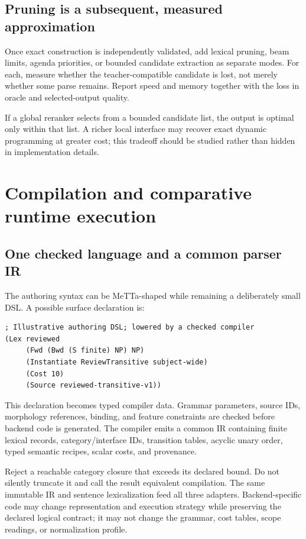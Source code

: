 \documentclass[11pt,a4paper]{article}
\begin{document}
\subsection{Pruning is a subsequent, measured approximation}
Once exact construction is independently validated, add lexical pruning,
beam limits, agenda priorities, or bounded candidate extraction as separate
modes. For each, measure whether the teacher-compatible candidate is lost,
not merely whether some parse remains. Report speed and memory together
with the loss in oracle and selected-output quality.

If a global reranker selects from a bounded candidate list, the output is
optimal only within that list. A richer local interface may recover exact
dynamic programming at greater cost; this tradeoff should be studied rather
than hidden in implementation details.

\section{Compilation and comparative runtime execution}\label{sec:mork}

\subsection{One checked language and a common parser IR}
The authoring syntax can be MeTTa-shaped while remaining a deliberately
small DSL. A possible surface declaration is:
\begin{lstlisting}
; Illustrative authoring DSL; lowered by a checked compiler
(Lex reviewed
     (Fwd (Bwd (S finite) NP) NP)
     (Instantiate ReviewTransitive subject-wide)
     (Cost 10)
     (Source reviewed-transitive-v1))
\end{lstlisting}
This declaration becomes typed compiler data. Grammar parameters, source
IDs, morphology references, binding, and feature constraints are checked
before backend code is generated. The compiler emits a common IR containing
finite lexical records, category/interface IDs, transition tables, acyclic
unary order, typed semantic recipes, scalar costs, and provenance.

Reject a reachable category closure that exceeds its declared bound.
Do not silently truncate it and call the result equivalent compilation.
The same immutable IR and sentence lexicalization feed all three adapters.
Backend-specific code may change representation and execution strategy
while preserving the declared logical contract; it may not change the
grammar, cost tables, scope readings, or normalization profile.
\end{document}

